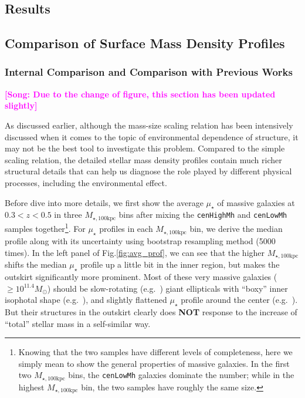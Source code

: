 \documentclass{emulateapj}
\def\rbcg{\texttt{cenHighMh}}
\def\nbcg{\texttt{cenLowMh}}
\def\mtot{{$M_{\star,100\mathrm{kpc}}$}}
\def\mden{{$\mu_{\star}$}}
\newcommand{\song}[1]{\textcolor{magenta}{\textbf{[Song: #1]}}}
\newcommand{\update}[1]{\textcolor{Bittersweet}{#1}}
\begin{document}
\begin{CJK*}{UTF8}{gbsn}

\section{Results}
    \label{sec:result}
    
\subsection{Comparison of Surface Mass Density Profiles}
    \label{ssec:sbp_compare}

\subsubsection{Internal Comparison and Comparison with Previous Works}
    \label{sssec:sbp_inter}
    
    \song{Due to the change of figure, this section has been updated slightly}
    
    As discussed earlier, although the mass-size scaling relation has been intensively 
    discussed when it comes to the topic of environmental dependence of structure, 
    it may not be the best tool to investigate this problem.    
    Compared to the simple scaling relation, the detailed stellar mass density profiles 
    contain much richer structural details that can help us diagnose the role played by 
    different physical processes, including the environmental effect.  
    
    \update{
    Before dive into more details, we first show the average \mden{} of massive galaxies 
    at $0.3 < z < 0.5$ in three \mtot{} bins after mixing the \rbcg{} and \nbcg{} 
    samples together\footnote{Knowing that the two samples have different levels of 
    completeness, here we simply mean to show the general properties of massive galaxies.
    In the first two \mtot{} bins, the \nbcg{} galaxies dominate the number; while in
    the highest \mtot{} bin, the two samples have roughly the same size.}.   
    For \mden{} profiles in each \mtot{} bin, we derive the median profile along with its 
    uncertainty using bootstrap resampling method (5000 times). 
    In the left panel of Fig.\ref{fig:avg_prof}, we can see that the higher \mtot{} 
    shifts the median \mden{} profile up a little bit in the inner region, but makes 
    the outskirt significantly more prominent. 
    Most of these very massive galaxies ($\ge 10^{11.4} M_{\odot}$) should be 
    slow-rotating (e.g.\ \citealt{Cappellari13b}) giant ellipticals with ``boxy'' inner 
    isophotal shape (e.g.\ \citealt{Kormendy2009}), and slightly flattened \mden{} profile 
    around the center (e.g.\ \citealt{Lauer07}).
    But their structures in the outskirt clearly does \textbf{NOT} response to the 
    increase of ``total'' stellar mass in a self-similar way.}
        

\end{CJK*}
\end{document}
